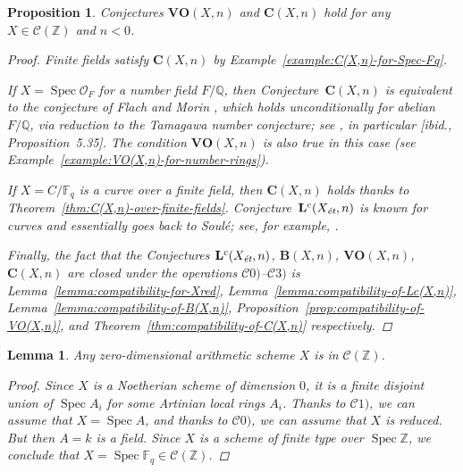 \documentclass[10pt,a4paper,oneside]{article}
\DeclareMathOperator{\Spec}{Spec}
\newcommand{\FF}{\mathbb{F}}
\newcommand{\QQ}{\mathbb{Q}}
\newcommand{\ZZ}{\mathbb{Z}}
\newcommand{\et}{\text{\it \'{e}t}}
\theoremstyle{myplain}
\newtheorem{proposition}[theorem]{Proposition}
\newtheorem{lemma}[theorem]{Lemma}
\theoremstyle{mydefinition}
\numberwithin{equation}{section}
\begin{document}
\begin{proposition}
  \label{prop:C(X,n)-holds-for-C(Z)}
  Conjectures $\mathbf{VO} (X,n)$ and $\mathbf{C} (X,n)$ hold for any
  $X \in \mathcal{C} (\ZZ)$ and $n < 0$.

  \begin{proof}
    Finite fields satisfy $\mathbf{C} (X,n)$ by
    Example~\ref{example:C(X,n)-for-Spec-Fq}.

    If $X = \Spec \mathcal{O}_F$ for a number field $F/\QQ$, then
    Conjecture~$\mathbf{C} (X,n)$ is equivalent to the conjecture of Flach and
    Morin \cite[Conjecture~5.12]{Flach-Morin-2018}, which holds unconditionally
    for abelian $F/\QQ$, via reduction to the Tamagawa number conjecture; see
    \cite[\S 5.8.3]{Flach-Morin-2018}, in particular
    [ibid., Proposition~5.35]. The condition $\mathbf{VO} (X,n)$ is also true in
    this case (see Example~\ref{example:VO(X,n)-for-number-rings}).

    If $X = C/\FF_q$ is a curve over a finite field, then $\mathbf{C} (X,n)$
    holds thanks to
    Theorem~\ref{thm:C(X,n)-over-finite-fields}.
    Conjecture~$\mathbf{L}^c (X_\et,n)$ is known for curves and essentially goes
    back to Soul\'{e}; see, for example, \cite[Proposition~4.3]{Geisser-2017}.

    Finally, the fact that the Conjectures $\mathbf{L}^c (X_\et,n)$,
    $\mathbf{B} (X,n)$, $\mathbf{VO} (X,n)$, $\mathbf{C} (X,n)$ are closed under
    the operations $\mathcal{C}0)$--$\mathcal{C}3)$ is
    Lemma~\ref{lemma:compatibility-for-Xred},
    Lemma~\ref{lemma:compatibility-of-Lc(X,n)},
    Lemma~\ref{lemma:compatibility-of-B(X,n)},
    Proposition~\ref{prop:compatibility-of-VO(X,n)}, and
    Theorem~\ref{thm:compatibility-of-C(X,n)} respectively.
  \end{proof}
\end{proposition}

\begin{lemma}
  Any zero-dimensional arithmetic scheme $X$ is in $\mathcal{C} (\ZZ)$.

  \begin{proof}
    Since $X$ is a Noetherian scheme of dimension $0$, it is a finite disjoint
    union of $\Spec A_i$ for some Artinian local rings $A_i$. Thanks to
    $\mathcal{C}1)$, we can assume that $X = \Spec A$, and thanks to
    $\mathcal{C}0)$, we can assume that $X$ is reduced. But then $A = k$ is a
    field. Since $X$ is a scheme of finite type over $\Spec \ZZ$, we conclude
    that $X = \Spec \FF_q \in \mathcal{C} (\ZZ)$.
  \end{proof}
\end{lemma}
\end{document}
